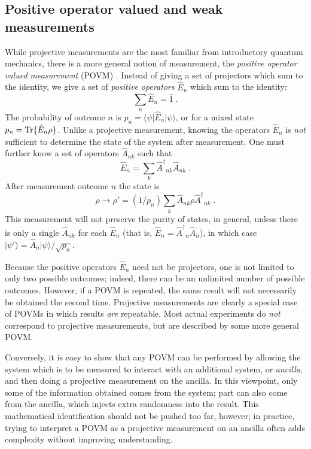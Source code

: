 \documentclass[12pt]{article}
\def\bra#1{{\langle #1 |}}
\def\ket#1{{| #1 \rangle}}
\def\id{{\hat 1}}
\def\tr{{\rm Tr}}
\def\E{{\hat E}}
\def\A{{\hat A}}
\def\Adag{{\hat A^\dagger}}
\begin{document}
\subsection{Positive operator valued and weak measurements}

While projective measurements are the most familiar from introductory
quantum mechanics, there is a more general notion of measurement, the
{\it positive operator valued measurement} (POVM) \cite{Peres}.
Instead of giving a set of projectors which sum to the identity, we
give a set of {\it positive operators} $\E_n$ which sum
to the identity:
\begin{equation}
\sum_n \E_n = \id \;.
\end{equation}
The probability of outcome $n$ is $p_n = \bra\psi\E_n\ket\psi$, or for
a mixed state $p_n = \tr\{\E_n\rho\}$.  Unlike a projective measurement,
knowing the operators $\E_n$ is {\it not} sufficient to determine the
state of the system after measurement.  One must further know a set of
operators $\A_{nk}$ such that
\begin{equation}
\E_n = \sum_k \Adag_{nk}\A_{nk} \;.
\end{equation}
After measurement outcome $n$ the state is
\begin{equation}
\rho \rightarrow \rho' = (1/p_n) \sum_k \A_{nk}\rho \Adag_{nk} \;.
\end{equation}
This measurement will not preserve the purity of states, in general, unless
there is only a single $\A_{nk}$ for each $\E_n$ (that is,
$\E_n = \Adag_n\A_n$), in which case $\ket{\psi'} = \A_n\ket\psi/\sqrt{p_n}$.

Because the positive operators $\E_n$ need not be projectors, one is not
limited to only two possible outcomes; indeed, there can be an unlimited
number of possible outcomes.  However, if a POVM is repeated, the same
result will not necessarily be obtained the second time.  Projective
measurements are clearly a special case of POVMs in which results {\it are}
repeatable.  Most actual experiments do {\it not} correspond to projective
measurements, but are described by some more general POVM.

Conversely, it is easy to show that any POVM can be performed by allowing
the system which is to be measured to interact with an
additional system, or {\it ancilla}, and then doing a projective measurement
on the ancilla.  In this viewpoint, only some of the information obtained
comes from the system; part can also come from the ancilla, which injects
extra randomness into the result.  This mathematical identification
should not be pushed too far, however; in practice, trying to interpret a
POVM as a projective measurement on an ancilla often adds complexity without
improving understanding.
\end{document}
